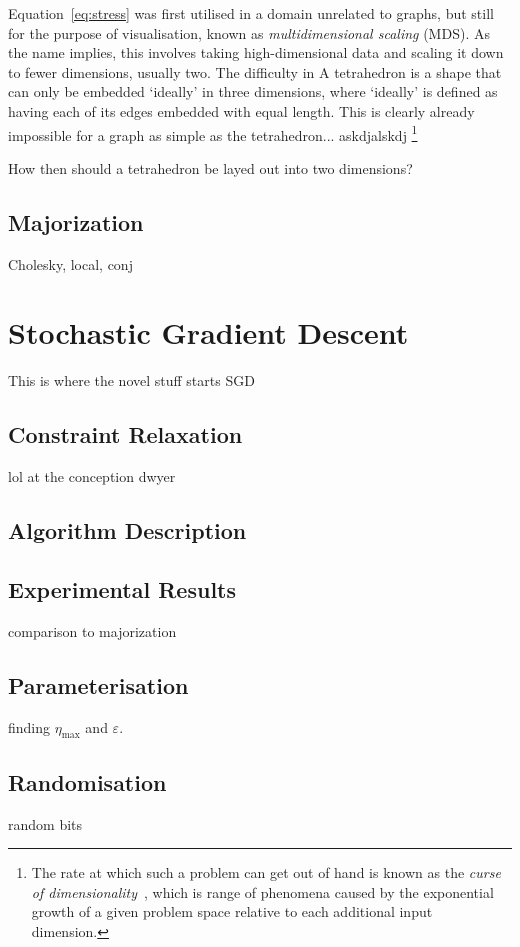 Equation~\eqref{eq:stress} was first utilised in a domain unrelated to graphs, but still for the purpose of visualisation, known as \emph{multidimensional scaling} (MDS). As the name implies, this involves taking high-dimensional data and scaling it down to fewer dimensions, usually two.
The difficulty in 
A tetrahedron is a shape that can only be embedded `ideally' in three dimensions, where `ideally' is defined as having each of its edges embedded with equal length. This is clearly already impossible for a graph as simple as the tetrahedron... askdjalskdj
\footnote{The rate at which such a problem can get out of hand is known as the \emph{curse of dimensionality}~\cite{Friedman2001}, which is range of phenomena caused by the exponential growth of a given problem space relative to each additional input dimension.}

How then should a tetrahedron be layed out into two dimensions? 

\subsection{Majorization}
Cholesky, local, conj

\section{Stochastic Gradient Descent}
\label{sec:sgd}
This is where the novel stuff starts SGD

\subsection{Constraint Relaxation}
\label{sec:wcr}
lol at the conception
dwyer

\subsection{Algorithm Description}

\subsection{Experimental Results}
comparison to majorization

\subsection{Parameterisation}
finding $\eta_{\max}$ and $\varepsilon$.

\subsection{Randomisation}
random bits

